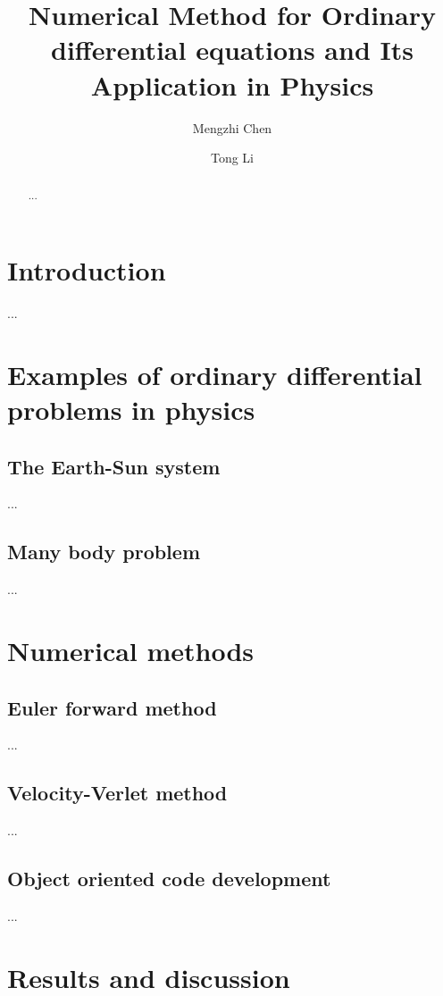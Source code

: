 \documentclass{article}
\title{Numerical Method for Ordinary differential equations and Its Application in Physics}
\author[1]{Mengzhi Chen}
\author[1]{Tong Li}
\affil[1]{Department of Physics and Astronomy, Michigan State University}
\date{}
\begin{document}
	\maketitle
	\begin{abstract}\label{abstract}
...
	\end{abstract}

\section{Introduction}\label{intro} 
	...
	
\section{Examples of ordinary differential problems in physics}\label{physcis_problem}
	
	\subsection{The Earth-Sun system}\label{earthsun}
	...

	\subsection{Many body problem}\label{quantumdot}
	...

\section{Numerical methods}\label{method}
  
	\subsection{Euler forward method}\label{euler}
	...
	
	\subsection{Velocity-Verlet method} \label{verlet}
	...
	
	\subsection{Object oriented code development}\label{obj}
	...
	
\section{Results and discussion}\label{results}
\end{document}
